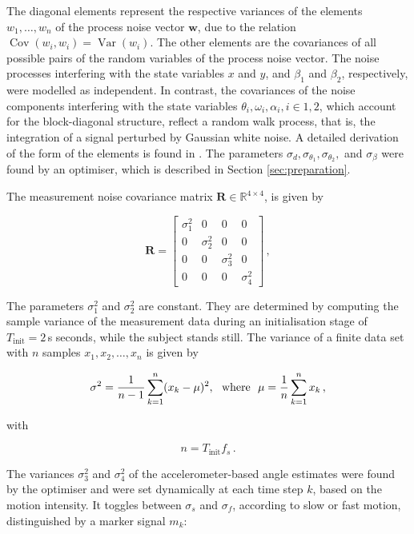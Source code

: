 \noindent
The diagonal elements represent the respective variances of the elements $w_1, \dots, w_n$ of the process noise vector $\mathbf{w}$, due to the relation $\operatorname{Cov}(w_i,w_i) = \operatorname{Var}(w_i)$. The other elements are the covariances of all possible pairs of the random variables of the process noise vector. The noise processes interfering with the state variables $x$ and $y$, and $\beta_1$ and $\beta_2$, respectively, were modelled as independent. In contrast, the covariances of the noise components interfering with the state variables $\theta_i, \omega_i, \alpha_i, i \in {1, 2}$, which account for the block-diagonal structure, reflect a random walk process, that is, the integration of a signal perturbed by Gaussian white noise. A detailed derivation of the form of the elements is found in \cite{Kelly_1994_random}. The parameters $\sigma_d, \sigma_{\theta_1}, \sigma_{\theta_2},$ and $\sigma_{\beta}$ were found by an optimiser, which is described in Section \ref{sec:preparation}.

The measurement noise covariance matrix $\mathbf{R} \in \mathbb{R}^{4 \times 4}$, is given by

\begin{equation}
\mathbf{R} = \begin{bmatrix}
  \sigma^2_1 & 0 & 0 & 0\\
  0 & \sigma^2_2 & 0 & 0\\
  0 & 0 & \sigma^2_3 & 0\\
  0 & 0 & 0 & \sigma^2_4
\end{bmatrix}\,,
\end{equation}

\noindent
The parameters $\sigma^2_1$ and $\sigma^2_2$ are constant. They are determined by computing the sample variance of the measurement data during an initialisation stage of $T_{\text{init}} = 2$\,s seconds, while the subject stands still. The variance of a finite data set with $n$ samples $x_1, x_2, \dots, x_n$ is given by

\begin{equation}
  \sigma^2 = \frac{1}{n-1} \sum_{k=1}^n (x_k - \mu)^2, {\rm \ \ where\ \ } \mu = \frac{1}{n} \sum_{k=1}^n x_k\,,
\end{equation}

\noindent
with

\begin{equation}
  n = T_{\text{init}} f_s\,.
\end{equation}

\noindent
The variances $\sigma^2_3$ and $\sigma^2_4$ of the accelerometer-based angle estimates were found by the optimiser and were set dynamically at each time step $k$, based on the motion intensity. It toggles between $\sigma_s$ and $\sigma_f$, according to slow or fast motion, distinguished by a marker signal $m_k$:

